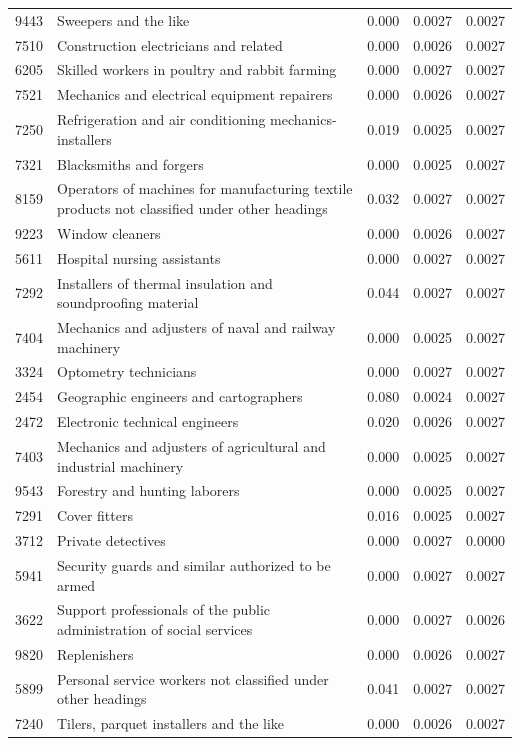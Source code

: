 \begin{longtable}{p{}>{\raggedright\arraybackslash}p{}rrr}
9443 & Sweepers and the like & 0.000 & 0.0027 & 0.0027 \\
7510 & Construction electricians and related & 0.000 & 0.0026 & 0.0027 \\
6205 & Skilled workers in poultry and rabbit farming & 0.000 & 0.0027 & 0.0027 \\
7521 & Mechanics and electrical equipment repairers & 0.000 & 0.0026 & 0.0027 \\
7250 & Refrigeration and air conditioning mechanics-installers & 0.019 & 0.0025 & 0.0027 \\
7321 & Blacksmiths and forgers & 0.000 & 0.0025 & 0.0027 \\
8159 & Operators of machines for manufacturing textile products not classified under other headings & 0.032 & 0.0027 & 0.0027 \\
9223 & Window cleaners & 0.000 & 0.0026 & 0.0027 \\
5611 & Hospital nursing assistants & 0.000 & 0.0027 & 0.0027 \\
7292 & Installers of thermal insulation and soundproofing material & 0.044 & 0.0027 & 0.0027 \\
7404 & Mechanics and adjusters of naval and railway machinery & 0.000 & 0.0025 & 0.0027 \\
3324 & Optometry technicians & 0.000 & 0.0027 & 0.0027 \\
2454 & Geographic engineers and cartographers & 0.080 & 0.0024 & 0.0027 \\
2472 & Electronic technical engineers & 0.020 & 0.0026 & 0.0027 \\
7403 & Mechanics and adjusters of agricultural and industrial machinery & 0.000 & 0.0025 & 0.0027 \\
9543 & Forestry and hunting laborers & 0.000 & 0.0025 & 0.0027 \\
7291 & Cover fitters & 0.016 & 0.0025 & 0.0027 \\
3712 & Private detectives & 0.000 & 0.0027 & 0.0000 \\
5941 & Security guards and similar authorized to be armed & 0.000 & 0.0027 & 0.0027 \\
3622 & Support professionals of the public administration of social services & 0.000 & 0.0027 & 0.0026 \\
9820 & Replenishers & 0.000 & 0.0026 & 0.0027 \\
5899 & Personal service workers not classified under other headings & 0.041 & 0.0027 & 0.0027 \\
7240 & Tilers, parquet installers and the like & 0.000 & 0.0026 & 0.0027 \\

\end{longtable}
